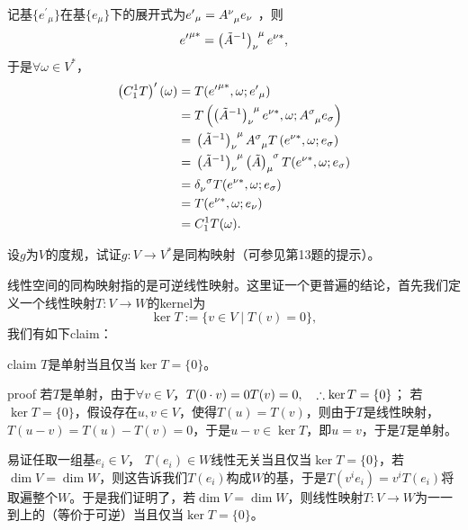 \begin{xiti}
    \begin{zm}
    	记基$ \{{e^\prime}_\mu \} $在基$\{e_\mu \}$下的展开式为${e^\prime}_\mu = \tensor{A}{^{\nu}_{\mu}}e_\nu $ ，则$${e^\prime}^{\mu*}=\tensor{\left(\tilde{A}^{-1} \right)}{_{\nu}^{\mu} } e^{\nu *} ,$$于是$\forall \omega\in V^* $，
    	\begin{align*}
    	\left(C_1^1 T\right)^\prime (\omega)=&\;  T({e^\prime}^{\mu*},\omega;{e^\prime}_\mu)\\
    	=&\; T\left(\tensor{\left(\tilde{A}^{-1} \right)}{_{\nu}^{\mu} } e^{\nu*},\omega;\tensor{A}{ ^{\sigma}_{\mu} } e_{\sigma} \right)\\
    	=&\;\tensor{\left(\tilde{A}^{-1} \right)}{_{\nu}^{\mu} } \tensor{A}{^{\sigma}_{\mu}} T\left( e^{\nu*},\omega;e_\sigma \right)\\
    	=&\;\tensor{\left(\tilde{A}^{-1} \right)}{_{\nu}^{\mu} } \tensor{\left( \tilde{A} \right)}{ _{\mu}^{\sigma} } T(e^{\nu*},\omega;e_\sigma)\\
    	=&\; \tensor{\delta}{_{\nu}^{\sigma}} T(e^{\nu*},\omega;e_\sigma)\\
    	=&\; T(e^{\nu*},\omega;e_\nu)\\
    	=&\; C_1^1 T(\omega).
    	\end{align*}
    \end{zm}

    \item 设$g$为$V$的度规，试证$ g\colon V\rightarrow V^* $是同构映射（可参见第13题的提示）。
    
    \begin{zm}
    	线性空间的同构映射指的是可逆线性映射。这里证一个更普遍的结论，首先我们定义一个线性映射$T\colon V\rightarrow W $的kernel为$$ \ker T:=\{ v\in V\mid T(v)=0 \}, $$我们有如下claim：
    	\begin{yl}{claim}
    		$T$是单射当且仅当$\ker T=\{0\}$。
    	\end{yl}
        \begin{yl}{proof}
        	若$T$是单射，由于$\forall v\in V$，$T(0\cdot v)=0T(v)=0\qc \therefore \ker T=\{0\} $；
        	若$\ker T=\{0\}$，假设存在$u,v\in V$，使得$T(u)=T(v)$，则由于$T$是线性映射，$T(u-v)=T(u)-T(v)=0$，于是$u-v \in \ker T $，即$u=v $，于是$T$是单射。
        \end{yl}
        易证任取一组基$e_i\in V $， $T(e_i)\in W$线性无关当且仅当$\ker T=\{0\} $，若$\dim V=\dim W $，则这告诉我们$T(e_i) $构成$W$的基，于是$T(v^i e_i)=v^i T(e_i)$将取遍整个$W$。于是我们证明了，若$\dim V=\dim W$，则线性映射$T\colon V\rightarrow W$为一一到上的（等价于可逆）当且仅当$\ker T=\{0\}$。
        

\end{zm}
\end{xiti}
